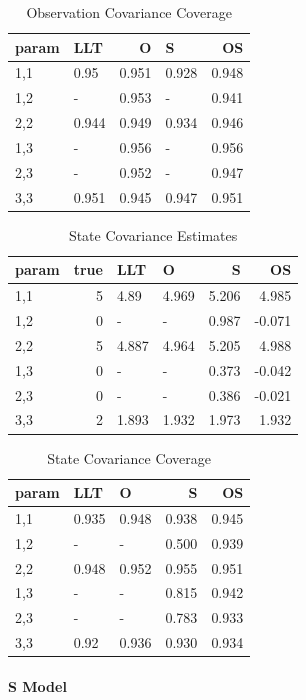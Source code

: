 \documentclass[
]{article}
\begin{document}
\begin{longtable}[t]{l|l|r|l|r}
\caption{\label{tab:unnamed-chunk-11}Observation Covariance Coverage}\\
\hline
param & LLT & O & S & OS\\
\hline
1,1 & 0.95 & 0.951 & 0.928 & 0.948\\
\hline
1,2 & - & 0.953 & - & 0.941\\
\hline
2,2 & 0.944 & 0.949 & 0.934 & 0.946\\
\hline
1,3 & - & 0.956 & - & 0.956\\
\hline
2,3 & - & 0.952 & - & 0.947\\
\hline
3,3 & 0.951 & 0.945 & 0.947 & 0.951\\
\hline
\end{longtable}

\begin{longtable}[t]{l|r|l|l|r|r}
\caption{\label{tab:unnamed-chunk-12}State Covariance Estimates}\\
\hline
param & true & LLT & O & S & OS\\
\hline
1,1 & 5 & 4.89 & 4.969 & 5.206 & 4.985\\
\hline
1,2 & 0 & - & - & 0.987 & -0.071\\
\hline
2,2 & 5 & 4.887 & 4.964 & 5.205 & 4.988\\
\hline
1,3 & 0 & - & - & 0.373 & -0.042\\
\hline
2,3 & 0 & - & - & 0.386 & -0.021\\
\hline
3,3 & 2 & 1.893 & 1.932 & 1.973 & 1.932\\
\hline
\end{longtable}

\begin{longtable}[t]{l|l|l|r|r}
\caption{\label{tab:unnamed-chunk-13}State Covariance Coverage}\\
\hline
param & LLT & O & S & OS\\
\hline
1,1 & 0.935 & 0.948 & 0.938 & 0.945\\
\hline
1,2 & - & - & 0.500 & 0.939\\
\hline
2,2 & 0.948 & 0.952 & 0.955 & 0.951\\
\hline
1,3 & - & - & 0.815 & 0.942\\
\hline
2,3 & - & - & 0.783 & 0.933\\
\hline
3,3 & 0.92 & 0.936 & 0.930 & 0.934\\
\hline
\end{longtable}

\hypertarget{s-model-1}{%
\paragraph{S Model}\label{s-model-1}}
\end{document}
